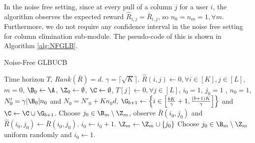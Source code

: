In the noise free setting, since at every pull of a column $j$ for a user $i$, the algorithm observes the expected reward $\hat{R}_{i,j} = \bar{R}_{i,j}$, so $n_0 =  n_m = 1, \forall m$. Furthermore, we do not require any confidence interval in the noise free setting for column elimination sub-module. The pseudo-code of this is shown in Algorithm \ref{alg:NFGLB}.

\begin{algorithm}[!th]
\caption{Noise-Free GLBUCB}
\label{alg:NFGLB}
\begin{algorithmic}[1]
 Time horizon $T$, $Rank(\bar{R}) = d$.
 $\gamma = \lceil\sqrt{K} \rceil$.
 $\hat{R}(i,j) \leftarrow 0, \forall i\in [K], j\in [L]$, $m=0$, $\B_0 \leftarrow \A$, $\Z_0 \leftarrow \emptyset$, $\C \leftarrow \emptyset$, $T[j]\leftarrow 0, \forall j\in [L]$, $i_0=1$, $j_0=1$ , $n_0 = 1 $, $N'_0 =  \gamma |\B_0|n_0 $ and $N_0 = N'_0 + K n_0 d$.
  
\State  $\G_{b+1}\leftarrow \left\lbrace i\in \left[\frac{bK}{\gamma}+1,\frac{(b+1)K}{\gamma}\right]\right\rbrace$ and $\C\leftarrow \C\cup \G_{b+1}$.
\EndFor
{}
\State Choose $j_0\in\B_m\setminus\Z_m$, observe $\bar{R}(i_0,j_0)$ and $\hat{R}(i_0,j_0)\leftarrow \bar{R}(i_0,j_0)$.
\State $i_0 \leftarrow i_0 + 1$.
\Else
\State $\Z_m \leftarrow \Z_m \cup \lbrace j_0\rbrace$
\State Choose $j_0\in\B_m\setminus \Z_m$ uniform randomly and $i_0 \leftarrow 1$.
\EndIf
\EndProcedure

 
\end{algorithmic}
\end{algorithm}
